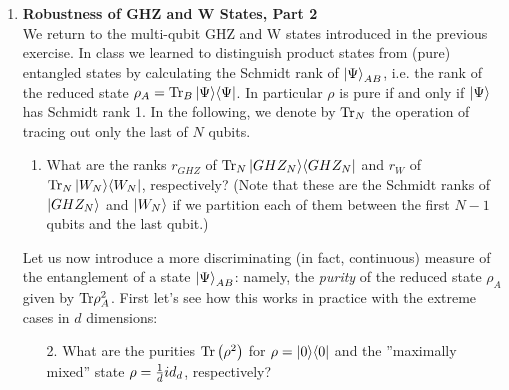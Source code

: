 \documentclass[12pt]{article}
\begin{document}
\begin{enumerate}
\item {\bf Robustness of GHZ and W States, Part 2}\\
We return to the multi-qubit GHZ and W states introduced in the previous exercise. 
In class we learned to distinguish product states from (pure) entangled states by calculating the Schmidt rank of $\ket{\Psi}_{AB}$, i.e. the rank of the reduced state $\rho_A=\mathrm{Tr}_B \ket{\Psi}\!\bra{\Psi}$. In particular $\rho$ is pure if and only if $\ket{\Psi}$ has Schmidt rank 1. In the following, we denote by $\mathrm{Tr}_N$ the operation of tracing out only the last of $N$ qubits.
\begin{enumerate}
\item What are the ranks $r_{GHZ}$ of $\mathrm{Tr}_N \ket{GHZ_N}\!\bra{GHZ_N}$ and $r_W$ of $\mathrm{Tr}_N \ket{W_N}\!\bra{W_N}$, respectively? (Note that these are the Schmidt ranks of $\ket{GHZ_N}$ and $\ket{W_N}$ if we partition each of them between the first $N-1$ qubits and the last qubit.)
%
\end{enumerate}
 Let us now introduce a more discriminating (in fact, continuous) measure of the entanglement of a state $\ket{\Psi}_{AB}$: namely, the \textit{purity} of the reduced state $\rho_A$ given by $\mathrm{Tr} \rho_A^2 $. First let's see how this works in practice with the extreme cases in $d$ dimensions:
\begin{enumerate}
\item[2.] What are the purities $\mathrm{Tr} \left(\rho^2\right)$ for $\rho=\ket{0}\!\bra{0}$ and the ''maximally mixed'' state $\rho=\frac{1}{d} id_d$, respectively?

\end{enumerate}
\end{enumerate}
\end{document}
